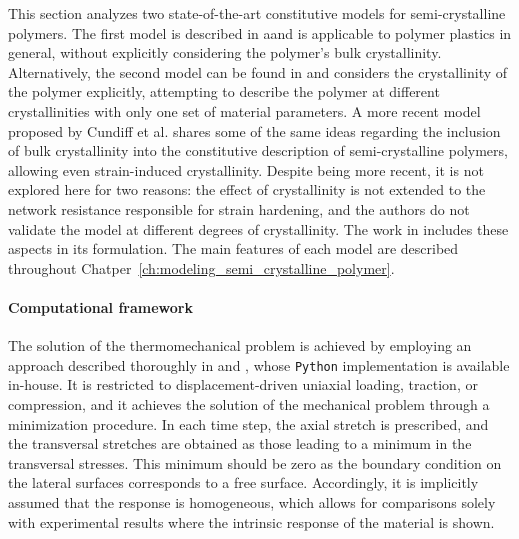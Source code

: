 This section analyzes two state-of-the-art constitutive models for semi-crystalline polymers.
The first model is described in \cite{haoUnifiedAmorphousCrystalline2022} aand is applicable to polymer plastics in general, without explicitly considering the polymer's bulk crystallinity.
Alternatively, the second model can be found in \cite{abdul-hameedTwophaseHyperelasticviscoplasticConstitutive2014} and considers the crystallinity of the polymer explicitly, attempting to describe the polymer at different crystallinities with only one set of material parameters.
A more recent model proposed by Cundiff et al. \citep{cundiffModelingViscoplasticBehavior2022} shares some of the same ideas regarding the inclusion of bulk crystallinity into the constitutive description of semi-crystalline polymers, allowing even strain-induced crystallinity.
Despite being more recent, it is not explored here for two reasons: the effect of crystallinity is not extended to the network resistance responsible for strain hardening, and the authors do not validate the model at different degrees of crystallinity.
The work in \citep{abdul-hameedTwophaseHyperelasticviscoplasticConstitutive2014} includes these aspects in its formulation.
The main features of each model are described throughout Chatper~\ref{ch:modeling_semi_crystalline_polymer}.

\paragraph{Computational framework}
The solution of the thermomechanical problem is achieved by employing an approach described thoroughly in \cite{bergstromMechanicsSolidPolymers2015} and \cite{alvesFastOptimizationbasedParameter2022}, whose \verb|Python| implementation is available in-house.
It is restricted to displacement-driven uniaxial loading, traction, or compression, and it achieves the solution of the mechanical problem through a minimization procedure.
In each time step, the axial stretch is prescribed, and the transversal stretches are obtained as those leading to a minimum in the transversal stresses.
This minimum should be zero as the boundary condition on the lateral surfaces corresponds to a free surface.
Accordingly, it is implicitly assumed that the response is homogeneous, which allows for comparisons solely with experimental results where the intrinsic response of the material is shown.

